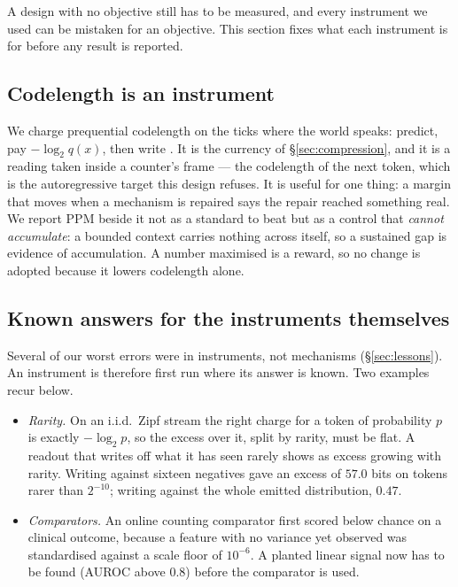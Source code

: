 \documentclass[11pt,a4paper]{article}
\theoremstyle{plain}
\theoremstyle{definition}
\theoremstyle{remark}
\begin{document}
A design with no objective still has to be measured, and every instrument we
used can be mistaken for an objective. This section fixes what each instrument
is for before any result is reported.

\subsection{Codelength is an instrument}

We charge prequential codelength on the ticks where the world speaks: predict,
pay $-\log_2 q(x)$, then write \citep{dawid1984present,blier2018description}.
It is the currency of \S\ref{sec:compression}, and it is a reading taken inside
a counter's frame --- the codelength of the next token, which is the
autoregressive target this design refuses. It is useful for one thing: a margin
that moves when a mechanism is repaired says the repair reached something real.
We report PPM \citep{cleary1984data} beside it not as a standard to beat but as
a control that \emph{cannot accumulate}: a bounded context carries nothing
across itself, so a sustained gap is evidence of accumulation. A number
maximised is a reward, so no change is adopted because it lowers codelength
alone.

\subsection{Known answers for the instruments themselves}

Several of our worst errors were in instruments, not mechanisms
(\S\ref{sec:lessons}). An instrument is therefore first run where its answer is
known. Two examples recur below.
\begin{itemize}
\item \emph{Rarity.} On an i.i.d.\ Zipf stream the right charge for a token of
probability $p$ is exactly $-\log_2 p$, so the excess over it, split by rarity,
must be flat. A readout that writes off what it has seen rarely shows as excess
growing with rarity. Writing against sixteen negatives gave an excess of
$57.0$ bits on tokens rarer than $2^{-10}$; writing against the whole
emitted distribution, $0.47$.
\item \emph{Comparators.} An online counting comparator first scored below
chance on a clinical outcome, because a feature with no variance yet observed
was standardised against a scale floor of $10^{-6}$. A planted linear signal
now has to be found (AUROC above $0.8$) before the comparator is used.
\end{itemize}
\end{document}
